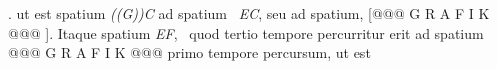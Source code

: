 {                        %
                    . ut est spatium \textit{((G))C} ad spatium \ \textit{EC}, seu ad spatium, [@@@ G R A F I K @@@%
                    ]. Itaque spatium \textit{EF}, \ quod tertio tempore percurritur erit ad spatium @@@ G R A F I K @@@%
                     primo tempore percursum, ut est \ }
